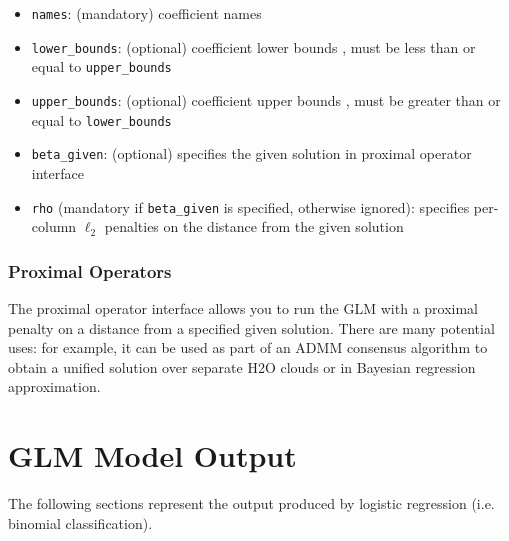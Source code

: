 \begin{itemize}
\item \texttt{names}: (mandatory) coefficient names
\item \texttt{lower\_bounds}: (optional) coefficient lower bounds , must be less than or equal to \texttt{upper\_bounds}
\item \texttt{upper\_bounds}: (optional) coefficient upper bounds , must be greater than or equal to \texttt{lower\_bounds}
\item \texttt{beta\_given}: (optional) specifies the given solution in proximal operator interface
\item \texttt{rho} (mandatory if \texttt{beta\_given} is specified, otherwise ignored): specifies per-column  $\ell_2$ penalties on the distance from the given solution
\end{itemize}
 
\subsubsection{Proximal Operators}

The proximal operator interface allows you to run the GLM with a proximal penalty on a distance from a specified
given solution. There are many potential uses: for example, it can be used as part of an ADMM consensus algorithm
to obtain a unified solution over separate H2O clouds or in Bayesian regression approximation.




\section{GLM Model Output}

The following sections represent the output produced by logistic regression (i.e. binomial classification).

